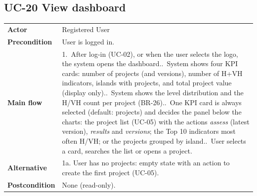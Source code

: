 \documentclass[11pt,a4paper]{article}
\begin{document}
\noindent\begin{minipage}{\linewidth}
\subsection*{UC-20 View dashboard}
\begin{tabularx}{\linewidth}{@{}>{\raggedright\leavevmode\bfseries\color{creBlue}}p{2.6cm} Y@{}}
\toprule
Actor & Registered User \\
Precondition & User is logged in. \\
Main flow & 1.~After log-in (UC-02), or when the user selects the logo, the system opens the dashboard..~System shows four KPI cards: number of projects (and versions), number of H+VH indicators, islands with projects, and total project value (display only)..~System shows the level distribution and the H/VH count per project (BR-26)..~One KPI card is always selected (default: projects) and decides the panel below the charts: the project list (UC-05) with the actions \emph{assess} (latest version), \emph{results} and \emph{versions}; the Top 10 indicators most often H/VH; or the projects grouped by island..~User selects a card, searches the list or opens a project. \\
Alternative & 1a. User has no projects: empty state with an action to create the first project (UC-05). \\
Postcondition & None (read-only). \\
\bottomrule
\end{tabularx}
\end{minipage}
\par\medskip
\end{document}
